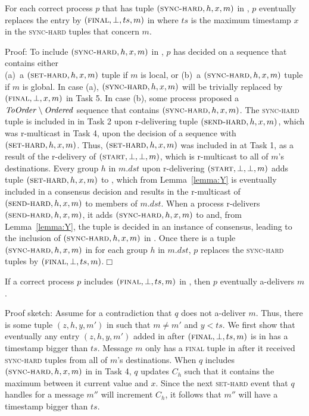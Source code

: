 \begin{lemma}
For each correct process $p$ that has tuple $(\textsc{sync-hard}, h, x, m)$ in \Buffer, $p$ eventually replaces the entry by $(\textsc{final}, \bot, ts, m)$ in \Buffer where $ts$ is the maximum timestamp $x$ in the \textsc{sync-hard} tuples that concern $m$.
\label{lemma:X}
\end{lemma}
\noindent
{\sc Proof:} 
To include $(\textsc{sync-hard}, h, x, m)$ in \Buffer, $p$ has decided on a sequence that contains either \\
(a)~a $(\textsc{set-hard}, h, x, m)$ tuple if $m$ is local, or 
(b)~a $(\textsc{sync-hard}, h, x, m)$ tuple if $m$ is global.
In case (a), $(\textsc{sync-hard}, h, x, m)$ will be trivially replaced by $(\textsc{final}, \bot, x, m)$ in Task 5.
In case (b), some process proposed a $\mathit{ToOrder} \setminus \mathit{Ordered}$ sequence that contains $(\textsc{sync-hard}, h, x, m)$.
The \textsc{sync-hard} tuple is included in \Pend in Task 2 upon r-delivering tuple $(\textsc{send-hard}, h, x, m)$, which was r-multicast in Task 4, upon the decision of a sequence with $(\textsc{set-hard}, h, x, m)$.
Thus, $(\textsc{set-hard}, h, x, m)$ was included in \Pend at Task 1, as a result of the r-delivery of $(\textsc{start}, \bot, \bot, m)$, which is r-multicast to all of $m$'s destinations.
Every group $h$ in $m.dst$ upon r-delivering $(\textsc{start}, \bot, \bot, m)$ adds tuple $(\textsc{set-hard}, h, x, m)$ to \Pend, which from Lemma~\ref{lemma:Y} is eventually included in a consensus decision and results in the r-multicast of $(\textsc{send-hard}, h, x, m)$ to members of $m.dst$.
When a process r-delivers $(\textsc{send-hard}, h, x, m)$, it adds $(\textsc{sync-hard}, h, x, m)$ to \Pend and, from Lemma~\ref{lemma:Y}, the tuple is decided in an instance of consensus, leading to the inclusion of $(\textsc{sync-hard}, h, x, m)$ in \Buffer.
Once there is a tuple $(\textsc{sync-hard}, h, x, m)$ in \Buffer for each group $h$ in $m.dst$, $p$ replaces the \textsc{sync-hard} tuples by $(\textsc{final}, \bot, ts, m)$.\hfill$\Box$

\begin{lemma}
If a correct process $p$ includes $(\textsc{final}, \bot, ts, m)$ in \Buffer, then $p$ eventually a-delivers $m$.
\label{lemma:Z}
\end{lemma}
\noindent
{\sc Proof sketch:} 
Assume for a contradiction that $q$ does not a-deliver $m$.
Thus, there is some tuple $(z,h,y,m')$ in \Buffer such that $m \neq m'$ and $y < ts $.
We first show that eventually any entry $(z,h,y,m')$ added in \Buffer after $(\textsc{final}, \bot, ts, m)$ is in \Buffer has a timestamp bigger than $ts$.
Message $m$ only has a \textsc{final} tuple in \Buffer after it received \textsc{sync-hard} tuples from all of $m$'s destinations.
When $q$ includes $(\textsc{sync-hard}, h, x, m)$ in \Buffer in Task 4, $q$ updates $C_h$ such that it contains the maximum between it current value and $x$.
Since the next \textsc{set-hard} event that $q$ handles for a message $m''$ will increment $C_h$, it follows that $m''$ will have a timestamp bigger than $ts$.


